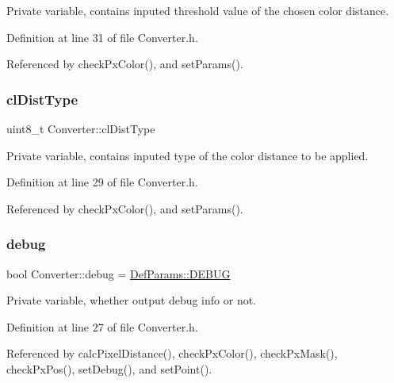 Private variable, contains inputed threshold value of the chosen color distance. 



Definition at line 31 of file Converter.\+h.



Referenced by check\+Px\+Color(), and set\+Params().

\mbox{\label{class_converter_a5d6037707465f267e1588735244be710}} 
\subsubsection{\texorpdfstring{clDistType}{clDistType}}
{\footnotesize\ttfamily uint8\+\_\+t Converter\+::cl\+Dist\+Type\hspace{0.3cm}{\ttfamily [private]}}



Private variable, contains inputed type of the color distance to be applied. 



Definition at line 29 of file Converter.\+h.



Referenced by check\+Px\+Color(), and set\+Params().

\mbox{\label{class_converter_a74f8e7af0fc2b296e50d29d0cc5f3651}} 
\subsubsection{\texorpdfstring{debug}{debug}}
{\footnotesize\ttfamily bool Converter\+::debug = \mbox{\hyperlink{namespace_def_params_a7e97783bd3e1a571a7f6c2297cbcd17c}{Def\+Params\+::\+D\+E\+B\+UG}}\hspace{0.3cm}{\ttfamily [private]}}



Private variable, whether output debug info or not. 



Definition at line 27 of file Converter.\+h.



Referenced by calc\+Pixel\+Distance(), check\+Px\+Color(), check\+Px\+Mask(), check\+Px\+Pos(), set\+Debug(), and set\+Point().

